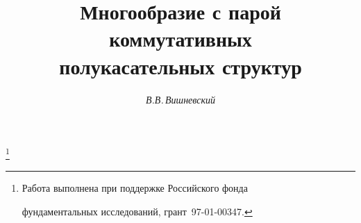 









\newcommand{\down}[2]{\underset{#1}{#2}{}}


\newcommand{\Ker}{\operatorname{Ker}}


\newcommand{\im}{\operatorname{Im}}






\newcommand{\tts}[1]{}




\renewcommand{\baselinestretch}{0.95}










\setcounter{page}{19}












\author{\it В.В.\,Вишневский}




\title{Многообразие с парой коммутативных\\


полукасательных структур}





\thanks{Работа выполнена при поддержке Российского фонда


фундаментальных исследований, грант \No\,97-01-00347.}


